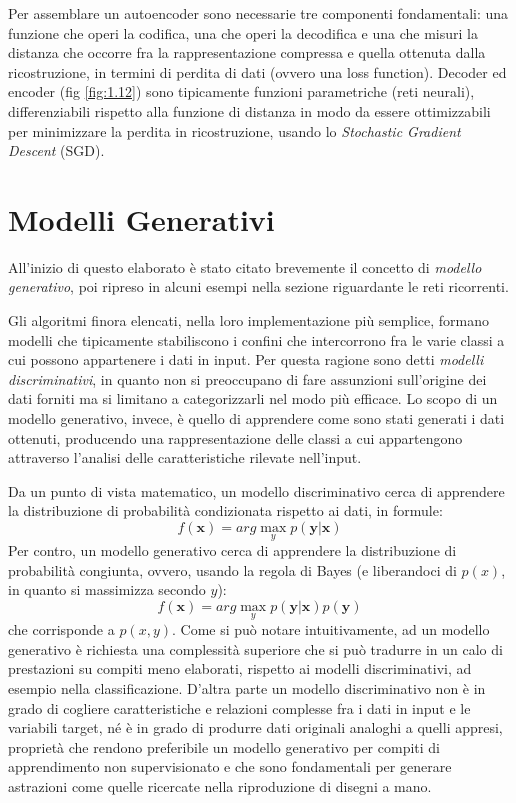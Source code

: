 Per assemblare un autoencoder sono necessarie tre componenti fondamentali: una funzione che operi la codifica, una che operi la decodifica e una che misuri la distanza che occorre fra la rappresentazione compressa e quella ottenuta dalla ricostruzione, in termini di perdita di dati (ovvero una loss function).
Decoder ed encoder (fig \ref{fig:1.12}) sono tipicamente funzioni parametriche (reti neurali), differenziabili rispetto alla funzione di distanza in modo da essere ottimizzabili per minimizzare la perdita in ricostruzione, usando lo \textit{Stochastic Gradient Descent} (SGD).
\section{Modelli Generativi} %
\label{sec:modelli_generativi}
All'inizio di questo elaborato è stato citato brevemente il concetto di \textit{modello generativo}, poi ripreso in alcuni esempi nella sezione riguardante le reti ricorrenti.

Gli algoritmi finora elencati, nella loro implementazione più semplice, formano modelli che tipicamente stabiliscono i confini che intercorrono fra le varie classi a cui possono appartenere i dati in input. Per questa ragione sono detti \textit{modelli discriminativi}, in quanto non si preoccupano di fare assunzioni sull'origine dei dati forniti ma si limitano a categorizzarli nel modo più efficace. Lo scopo di un modello generativo, invece, è quello di apprendere come sono stati generati i dati ottenuti, producendo una rappresentazione delle classi a cui appartengono attraverso l'analisi delle caratteristiche rilevate nell'input.

Da un punto di vista matematico, un modello discriminativo cerca di apprendere la distribuzione di probabilità condizionata rispetto ai dati, in formule: 
\begin{equation}
	\label{conditional}
	f(\boldsymbol{x}) = arg \max_y p(\boldsymbol{y}|\boldsymbol{x})
\end{equation}
Per contro, un modello generativo cerca di apprendere la distribuzione di probabilità congiunta, ovvero, usando la regola di Bayes (e liberandoci di $p(x)$, in quanto si massimizza secondo $y$):
\begin{equation}
	\label{joint}
	f(\boldsymbol{x}) = arg\max_y p(\boldsymbol{y}|\boldsymbol{x})p(\boldsymbol{y})
\end{equation}
che corrisponde a $p(x, y)$. Come si può notare intuitivamente, ad un modello generativo è richiesta una complessità superiore che si può tradurre in un calo di prestazioni su compiti meno elaborati, rispetto ai modelli discriminativi, ad esempio nella classificazione. D'altra parte un modello discriminativo non è in grado di cogliere caratteristiche e relazioni complesse fra i dati in input e le variabili target, né è in grado di produrre dati originali analoghi a quelli appresi, proprietà che rendono preferibile un modello generativo per compiti di apprendimento non supervisionato e che sono fondamentali per generare astrazioni come quelle ricercate nella riproduzione di disegni a mano.

